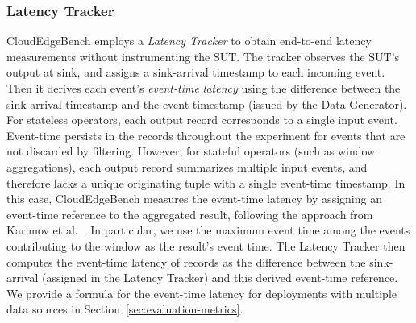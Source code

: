 \documentclass[runningheads]{llncs}
\begin{document}
\subsubsection{Latency Tracker}
CloudEdgeBench employs a \textit{Latency Tracker} to obtain end-to-end latency measurements without instrumenting the SUT.
The tracker observes the SUT's output at sink, and assigns a sink-arrival timestamp to each incoming event.
Then it derives each event's \textit{event-time latency} using the difference between the sink-arrival timestamp and the event timestamp (issued by the Data Generator).
%
For stateless operators, each output record corresponds to a single input event.
Event-time persists in the records throughout the experiment for events that are not discarded by filtering.
However, for stateful operators (such as window aggregations), each output record summarizes multiple input events, and therefore lacks a unique originating tuple with a single event-time timestamp. 
In this case, CloudEdgeBench measures the event-time latency by assigning an event-time reference to the aggregated result, following the approach from Karimov et al.~\cite{karimov2018}.
In particular, we use the maximum event time among the events contributing to the window as the result's event time.
The Latency Tracker then computes the event-time latency of records as the difference between the sink-arrival (assigned in the Latency Tracker) and this derived event-time reference.
We provide a formula for the event-time latency for deployments with multiple data sources in Section~\ref{sec:evaluation-metrics}.

\end{document}

